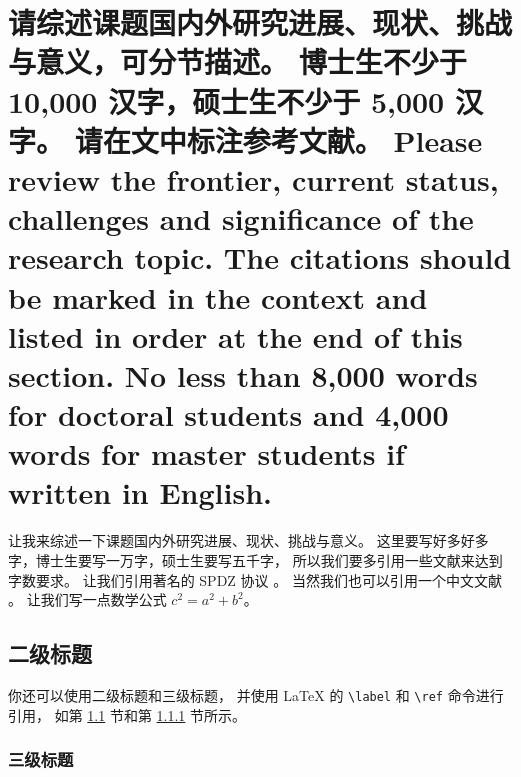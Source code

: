 \documentclass[a4paper,zihao=-4,AutoFakeBold]{ctexart}
\begin{document}
\makeatletter
{}
\makeatother




\section{请综述课题国内外研究进展、现状、挑战与意义，可分节描述。
    博士生不少于 10,000 汉字，硕士生不少于 5,000 汉字。
    请在文中标注参考文献。 
    Please review the frontier, current status, 
    challenges and significance of the research topic. 
    The citations should be marked in the context 
    and listed in order at the end of this section. 
    No less than 8,000 words for doctoral students 
    and 4,000 words for master students if written in English.}


让我来综述一下课题国内外研究进展、现状、挑战与意义。
这里要写好多好多字，博士生要写一万字，硕士生要写五千字，
所以我们要多引用一些文献来达到字数要求。
让我们引用著名的 SPDZ 协议 \cite{SPDZ}。
当然我们也可以引用一个中文文献 \cite{ZJSD}。
让我们写一点数学公式 $c^2 = a^2 + b^2$。


\subsection{二级标题}\label{sub}

你还可以使用二级标题和三级标题，
并使用 \LaTeX{} 的 \verb|\label| 和 \verb|\ref| 命令进行引用，
如第 \ref{sub} 节和第 \ref{subsub} 节所示。



\subsubsection{三级标题}\label{subsub}
\end{document}
